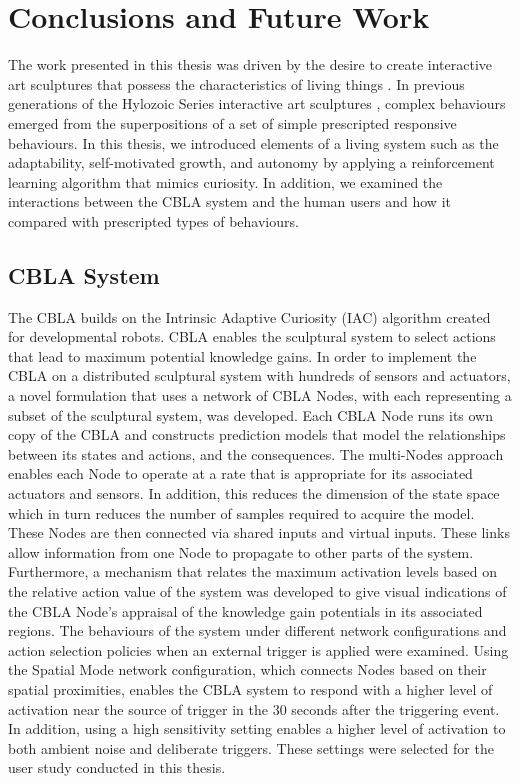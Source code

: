 \chapter{Conclusions and Future Work} \label{chap:conclusions}
 
The work presented in this thesis was driven by the desire to create interactive art sculptures that possess the characteristics of living things \cite{Gorbet2015}. In previous generations of the Hylozoic Series interactive art sculptures \cite{Beesley2012}, complex behaviours emerged from the superpositions of a set of simple prescripted responsive behaviours. In this thesis, we introduced elements of a living system such as the adaptability, self-motivated growth, and autonomy by applying a reinforcement learning algorithm that mimics curiosity. In addition, we examined the interactions between the CBLA system and the human users and how it compared with prescripted types of behaviours.
 
\section{CBLA System}
The CBLA builds on the Intrinsic Adaptive Curiosity (IAC) algorithm \cite{Oudeyer2007} created for developmental robots. CBLA enables the sculptural system to select actions that lead to maximum potential knowledge gains. In order to implement the CBLA on a distributed sculptural system with hundreds of sensors and actuators, a novel formulation that uses a network of CBLA Nodes, with each representing a subset of the sculptural system, was developed. Each CBLA Node runs its own copy of the CBLA and constructs prediction models that model the relationships between its states and actions, and the consequences. The multi-Nodes approach enables each Node to operate at a rate that is appropriate for its associated actuators and sensors. In addition, this reduces the dimension of the state space which in turn reduces the number of samples required to acquire the model. These Nodes are then connected via shared inputs and virtual inputs. These links allow information from one Node to propagate to other parts of the system. Furthermore, a mechanism that relates the maximum activation levels based on the relative action value of the system was developed to give visual indications of the CBLA Node's appraisal of the knowledge gain potentials in its associated regions. The behaviours of the system under different network configurations and action selection policies when an external trigger is applied were examined. Using the Spatial Mode network configuration, which connects Nodes based on their spatial proximities, enables the CBLA system to respond with a higher level of activation near the source of trigger in the 30 seconds after the triggering event. In addition, using a high sensitivity setting enables a higher level of activation to both ambient noise and deliberate triggers. These settings were selected for the user study conducted in this thesis.


